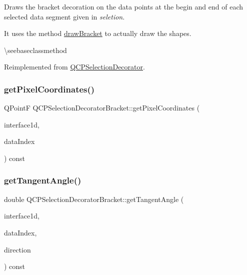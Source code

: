 Draws the bracket decoration on the data points at the begin and end of each selected data segment given in {\itshape seletion}.

It uses the method \mbox{\hyperlink{class_q_c_p_selection_decorator_bracket_a57b65b5508d5bd0f27c9318f3d4646be}{draw\+Bracket}} to actually draw the shapes.

\textbackslash{}seebaseclassmethod 

Reimplemented from \mbox{\hyperlink{class_q_c_p_selection_decorator_a4f8eb49e277063845391e803ae23054a}{Q\+C\+P\+Selection\+Decorator}}.

\mbox{\label{class_q_c_p_selection_decorator_bracket_a9925ed667e8a645fcb9949bd02ee4a19}} 
\subsubsection{\texorpdfstring{getPixelCoordinates()}{getPixelCoordinates()}}
{\footnotesize\ttfamily Q\+PointF Q\+C\+P\+Selection\+Decorator\+Bracket\+::get\+Pixel\+Coordinates (\begin{DoxyParamCaption}\item[{const \mbox{\hyperlink{class_q_c_p_plottable_interface1_d}{Q\+C\+P\+Plottable\+Interface1D}} $\ast$}]{interface1d,  }\item[{int}]{data\+Index }\end{DoxyParamCaption}) const\hspace{0.3cm}{\ttfamily [protected]}}

\mbox{\label{class_q_c_p_selection_decorator_bracket_ac002e20586950bf5c91a399863769c61}} 
\subsubsection{\texorpdfstring{getTangentAngle()}{getTangentAngle()}}
{\footnotesize\ttfamily double Q\+C\+P\+Selection\+Decorator\+Bracket\+::get\+Tangent\+Angle (\begin{DoxyParamCaption}\item[{const \mbox{\hyperlink{class_q_c_p_plottable_interface1_d}{Q\+C\+P\+Plottable\+Interface1D}} $\ast$}]{interface1d,  }\item[{int}]{data\+Index,  }\item[{int}]{direction }\end{DoxyParamCaption}) const\hspace{0.3cm}{\ttfamily [protected]}}

